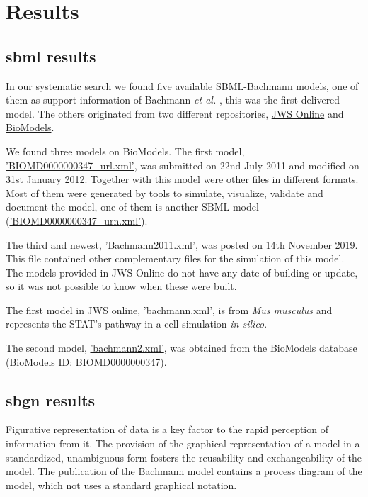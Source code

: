 \section*{Results} \label{sec:resuslt}
\subsection*{\acf{sbml} results}
In our systematic search we found five available SBML-Bachmann models, one of them as support information of Bachmann \textit{et al.} \cite{bachmannmodel}, this was the first delivered model. The others originated  from two different repositories, \hyperlink{https://www.systemsmedicine.net/posts/jws-online-biological-systems-modelling}{JWS Online} and \hyperlink{https://www.ebi.ac.uk/biomodels/}{BioModels}.

We found three models on BioModels. The first model, \hyperlink{https://www.ebi.ac.uk/biomodels/model/download/BIOMD0000000347.2?filename=BIOMD0000000347_url.xml}{'BIOMD0000000347\_url.xml'}, was submitted on 22nd July 2011 and modified on 31st January 2012. Together with this model were other files in different formats. Most of them were generated by tools to simulate, visualize, validate and document the model, one of them is another SBML model (\hyperlink{https://www.ebi.ac.uk/biomodels/model/download/BIOMD0000000347.2?filename=BIOMD0000000347_url.xml}{'BIOMD0000000347\_urn.xml'}). 

The third and newest, \hyperlink{https://www.ebi.ac.uk/biomodels/model/download/BIOMD0000000861.2?filename=Bachmann2011.xml}{'Bachmann2011.xml'}, was posted on 14th November 2019. This file contained other complementary files for the simulation of this model. The models provided in JWS Online do not have any date of building or update, so it was not possible to know when these were built. 

The first model in JWS online, \hyperlink{https://jjj.bio.vu.nl/models/bachmann/sbml/?download=1}{'bachmann.xml'}, is from \textit{Mus musculus} and represents the STAT's pathway in a cell simulation \textit{in silico}. 

The second model, \hyperlink{https://jjj.bio.vu.nl/models/bachmann2/sbml/?download=1}{'bachmann2.xml'}, was obtained from the BioModels database (BioModels ID: BIOMD0000000347).

\subsection*{\acf{sbgn} results}
Figurative representation of data is a key factor to the rapid perception of information from it. The provision of the graphical representation of a model in a standardized, unambiguous form fosters the reusability and exchangeability of the model. The publication of the Bachmann model contains a process diagram of the model, which not uses a standard graphical notation.

